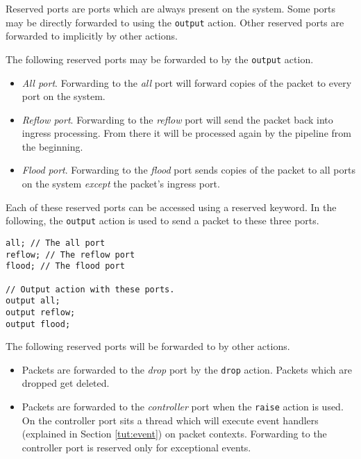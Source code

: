 Reserved ports are ports which are always present on the system. Some ports may
be directly forwarded to using the \texttt{output} action. Other reserved ports are forwarded to implicitly by
other actions.

The following reserved ports may be forwarded to by the \texttt{output} action.

\begin{itemize}
\item \emph{All port}. Forwarding to the \textit{all} port will forward copies of the packet to
every port on the system.

\item \emph{Reflow port}. Forwarding to the \textit{reflow} port will send the packet back into
ingress processing. From there it will be processed again by the pipeline from
the beginning.

\item \emph{Flood port}. Forwarding to the \textit{flood} port sends copies of the packet to all
ports on the system \textit{except} the packet's ingress port.
\end{itemize}

Each of these reserved ports can be accessed using a reserved keyword. In the
following, the \texttt{output} action is used to send a packet to these three
ports.

\begin{codepage}
\begin{lstlisting}
all; // The all port
reflow; // The reflow port
flood; // The flood port

// Output action with these ports.
output all;
output reflow;
output flood;
\end{lstlisting}
\end{codepage}

The following reserved ports will be forwarded to by other actions.

\begin{itemize}
\item Packets are forwarded to the \textit{drop} port by the \texttt{drop} action.
Packets which are dropped get deleted.

\item Packets are forwarded to the \textit{controller} port when the \texttt{raise}
action is used. On the controller port sits a thread which will
execute event handlers (explained in Section \ref{tut:event}) on packet
contexts. Forwarding to the controller port is reserved only for exceptional
events.
\end{itemize}

